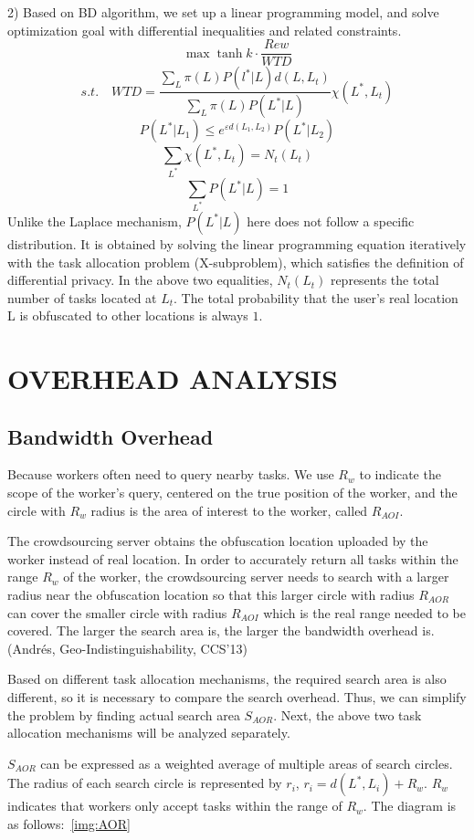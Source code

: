 2) Based on BD algorithm, we set up a linear programming model, and solve optimization goal with differential inequalities and related constraints.
$$
	\max \tanh {k \cdot \frac{Rew}{WTD}}
$$
$$
	s.t. \quad WTD=\frac {\sum_L \pi(L) P(l^*|L) d(L,L_t)} {\sum_L \pi(L) P(L^*|L)} \chi(L^*,L_t)
$$
$$
	P(L^*|L_1) \leq e^{\varepsilon d(L_1,L_2)} P(L^*|L_2) 
$$
$$
	\sum_{L^*} \chi(L^*,L_t)=N_t (L_t)
$$
$$
	\sum_{L^*} P(L^*|L)=1
$$
Unlike the Laplace mechanism, $P(L^*|L)$ here does not follow a specific distribution. It is obtained by solving the linear programming equation iteratively with the task allocation problem (X-subproblem), which satisfies the definition of differential privacy. In the above two equalities, $N_t (L_t)$ represents the total number of tasks located at $L_t$. The total probability that the user’s real location L is obfuscated to other locations is always $1$.

\section{OVERHEAD ANALYSIS} %
\label{Sec5}
\subsection{Bandwidth Overhead} %
Because workers often need to query nearby tasks. We use $R_w$ to indicate the scope of the worker's query, centered on the true position of the worker, and the circle with $R_w$ radius is the area of interest to the worker, called $R_{AOI}$.

The crowdsourcing server obtains the obfuscation location uploaded by the worker instead of real location. In order to accurately return all tasks within the range $R_w$ of the worker, the crowdsourcing server needs to search with a larger radius near the obfuscation location so that this larger circle with radius $R_{AOR}$ can cover the smaller circle with radius $R_{AOI}$ which is the real range needed to be covered. The larger the search area is, the larger the bandwidth overhead is. (Andrés, Geo-Indistinguishability, CCS’13)

Based on different task allocation mechanisms, the required search area is also different, so it is necessary to compare the search overhead. Thus, we can simplify the problem by finding actual search area $S_{AOR}$. Next, the above two task allocation mechanisms will be analyzed separately.

$S_{AOR}$ can be expressed as a weighted average of multiple areas of search circles. The radius of each search circle is represented by $r_i$, $r_i=d(L^*,L_i)+R_w$. $R_w$ indicates that workers only accept tasks within the range of $R_w$. The diagram is as follows:~\ref{img:AOR}

